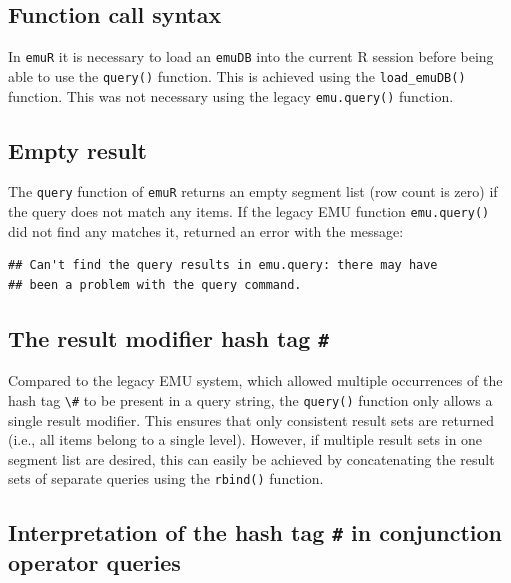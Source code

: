 \documentclass[]{book}
\theoremstyle{definition}
\theoremstyle{definition}
\theoremstyle{definition}
\theoremstyle{remark}
\begin{document}
\hypertarget{function-call-syntax}{%
\subsection{Function call syntax}\label{function-call-syntax}}

In \texttt{emuR} it is necessary to load an \texttt{emuDB} into the
current R session before being able to use the \texttt{query()}
function. This is achieved using the \texttt{load\_emuDB()} function.
This was not necessary using the legacy \texttt{emu.query()} function.

\hypertarget{empty-result}{%
\subsection{Empty result}\label{empty-result}}

The \texttt{query} function of \texttt{emuR} returns an empty segment
list (row count is zero) if the query does not match any items. If the
legacy EMU function \texttt{emu.query()} did not find any matches it,
returned an error with the message:

\begin{verbatim}
## Can't find the query results in emu.query: there may have 
## been a problem with the query command.
\end{verbatim}

\hypertarget{the-result-modifier-hash-tag}{%
\subsection{\texorpdfstring{The result modifier hash tag
\texttt{\#}}{The result modifier hash tag \#}}\label{the-result-modifier-hash-tag}}

Compared to the legacy EMU system, which allowed multiple occurrences of
the hash tag \texttt{\textbackslash{}\#} to be present in a query
string, the \texttt{query()} function only allows a single result
modifier. This ensures that only consistent result sets are returned
(i.e., all items belong to a single level). However, if multiple result
sets in one segment list are desired, this can easily be achieved by
concatenating the result sets of separate queries using the
\texttt{rbind()} function.

\hypertarget{interpretation-of-the-hash-tag-in-conjunction-operator-queries}{%
\subsection{\texorpdfstring{Interpretation of the hash tag \texttt{\#}
in conjunction operator
queries}{Interpretation of the hash tag \# in conjunction operator queries}}\label{interpretation-of-the-hash-tag-in-conjunction-operator-queries}}
\end{document}
